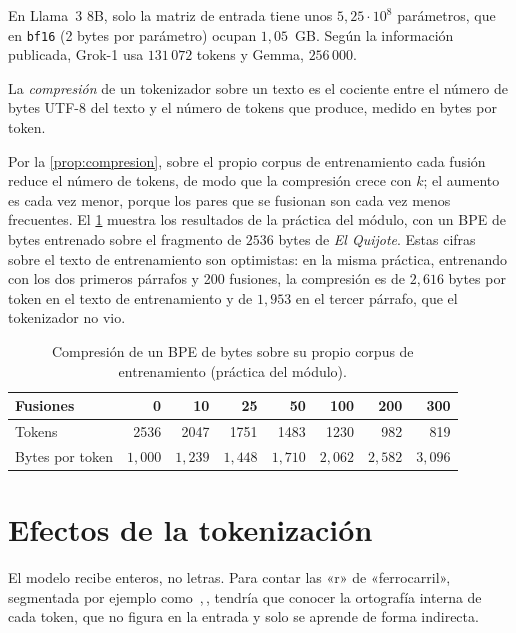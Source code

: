 En Llama~3 8B, solo la matriz de entrada tiene unos $5{,}25\cdot 10^{8}$ parámetros, que en \texttt{bf16} (2 bytes por parámetro) ocupan $1{,}05$~GB. Según la información publicada, Grok-1 usa $131\,072$ tokens y Gemma, $256\,000$.

\begin{definicion}[Compresión]
La \emph{compresión} de un tokenizador sobre un texto es el cociente entre el número de bytes UTF-8 del texto y el número de tokens que produce, medido en bytes por token.
\end{definicion}

Por la \cref{prop:compresion}, sobre el propio corpus de entrenamiento cada fusión reduce el número de tokens, de modo que la compresión crece con $k$; el aumento es cada vez menor, porque los pares que se fusionan son cada vez menos frecuentes. El \cref{tab:compresion} muestra los resultados de la práctica del módulo, con un BPE de bytes entrenado sobre el fragmento de $2536$ bytes de \emph{El Quijote}. Estas cifras sobre el texto de entrenamiento son optimistas: en la misma práctica, entrenando con los dos primeros párrafos y 200 fusiones, la compresión es de $2{,}616$ bytes por token en el texto de entrenamiento y de $1{,}953$ en el tercer párrafo, que el tokenizador no vio.

\begin{table}[h]
\centering\small
\caption{Compresión de un BPE de bytes sobre su propio corpus de entrenamiento (práctica del módulo).}\label{tab:compresion}
\begin{tabular}{@{}lrrrrrrr@{}}
\toprule
Fusiones & 0 & 10 & 25 & 50 & 100 & 200 & 300 \\
\midrule
Tokens & 2536 & 2047 & 1751 & 1483 & 1230 & 982 & 819 \\
Bytes por token & $1{,}000$ & $1{,}239$ & $1{,}448$ & $1{,}710$ & $2{,}062$ & $2{,}582$ & $3{,}096$ \\
\bottomrule
\end{tabular}
\end{table}

\section{Efectos de la tokenización}

\begin{observacion}[Letras]
El modelo recibe enteros, no letras. Para contar las «r» de «ferrocarril», segmentada por ejemplo como \,\sep{}\,, tendría que conocer la ortografía interna de cada token, que no figura en la entrada y solo se aprende de forma indirecta.
\end{observacion}

